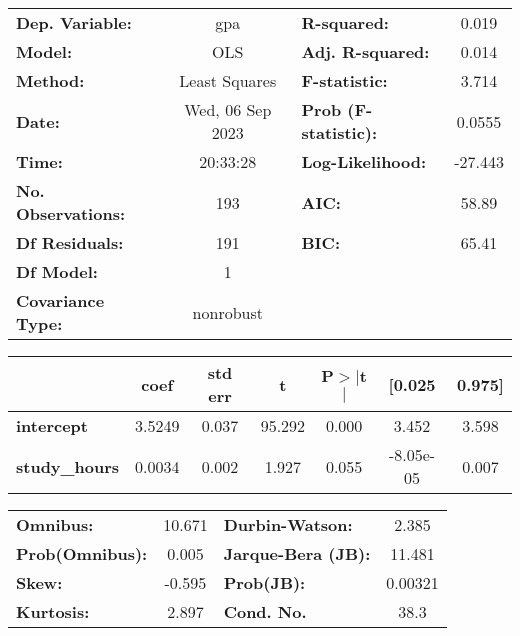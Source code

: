 \documentclass[
  letterpaper,
  DIV=11,
  numbers=noendperiod]{scrreprt}
\begin{document}
\begin{center}
\begin{tabular}{lclc}
\toprule
\textbf{Dep. Variable:}    &       gpa        & \textbf{  R-squared:         } &     0.019   \\
\textbf{Model:}            &       OLS        & \textbf{  Adj. R-squared:    } &     0.014   \\
\textbf{Method:}           &  Least Squares   & \textbf{  F-statistic:       } &     3.714   \\
\textbf{Date:}             & Wed, 06 Sep 2023 & \textbf{  Prob (F-statistic):} &   0.0555    \\
\textbf{Time:}             &     20:33:28     & \textbf{  Log-Likelihood:    } &   -27.443   \\
\textbf{No. Observations:} &         193      & \textbf{  AIC:               } &     58.89   \\
\textbf{Df Residuals:}     &         191      & \textbf{  BIC:               } &     65.41   \\
\textbf{Df Model:}         &           1      & \textbf{                     } &             \\
\textbf{Covariance Type:}  &    nonrobust     & \textbf{                     } &             \\
\bottomrule
\end{tabular}
\begin{tabular}{lcccccc}
                      & \textbf{coef} & \textbf{std err} & \textbf{t} & \textbf{P$> |$t$|$} & \textbf{[0.025} & \textbf{0.975]}  \\
\midrule
\textbf{intercept}    &       3.5249  &        0.037     &    95.292  &         0.000        &        3.452    &        3.598     \\
\textbf{study\_hours} &       0.0034  &        0.002     &     1.927  &         0.055        &    -8.05e-05    &        0.007     \\
\bottomrule
\end{tabular}
\begin{tabular}{lclc}
\textbf{Omnibus:}       & 10.671 & \textbf{  Durbin-Watson:     } &    2.385  \\
\textbf{Prob(Omnibus):} &  0.005 & \textbf{  Jarque-Bera (JB):  } &   11.481  \\
\textbf{Skew:}          & -0.595 & \textbf{  Prob(JB):          } &  0.00321  \\
\textbf{Kurtosis:}      &  2.897 & \textbf{  Cond. No.          } &     38.3  \\
\bottomrule
\end{tabular}
\end{center}
\end{document}
